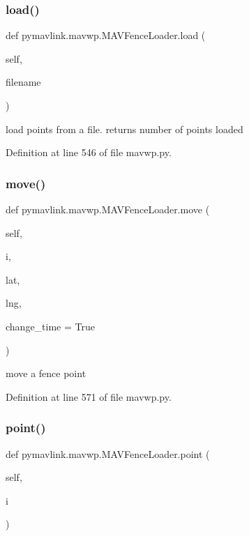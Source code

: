 \subsubsection{\texorpdfstring{load()}{load()}}
{\footnotesize\ttfamily def pymavlink.\+mavwp.\+M\+A\+V\+Fence\+Loader.\+load (\begin{DoxyParamCaption}\item[{}]{self,  }\item[{}]{filename }\end{DoxyParamCaption})}

\begin{DoxyVerb}load points from a file.
returns number of points loaded\end{DoxyVerb}
 

Definition at line 546 of file mavwp.\+py.

\mbox{\label{classpymavlink_1_1mavwp_1_1MAVFenceLoader_a3a8c6237c42535dd031f28da0a9139ea}} 
\subsubsection{\texorpdfstring{move()}{move()}}
{\footnotesize\ttfamily def pymavlink.\+mavwp.\+M\+A\+V\+Fence\+Loader.\+move (\begin{DoxyParamCaption}\item[{}]{self,  }\item[{}]{i,  }\item[{}]{lat,  }\item[{}]{lng,  }\item[{}]{change\+\_\+time = {\ttfamily True} }\end{DoxyParamCaption})}

\begin{DoxyVerb}move a fence point\end{DoxyVerb}
 

Definition at line 571 of file mavwp.\+py.

\mbox{\label{classpymavlink_1_1mavwp_1_1MAVFenceLoader_adf811be126be216f243c8c3e5410095b}} 
\subsubsection{\texorpdfstring{point()}{point()}}
{\footnotesize\ttfamily def pymavlink.\+mavwp.\+M\+A\+V\+Fence\+Loader.\+point (\begin{DoxyParamCaption}\item[{}]{self,  }\item[{}]{i }\end{DoxyParamCaption})}

